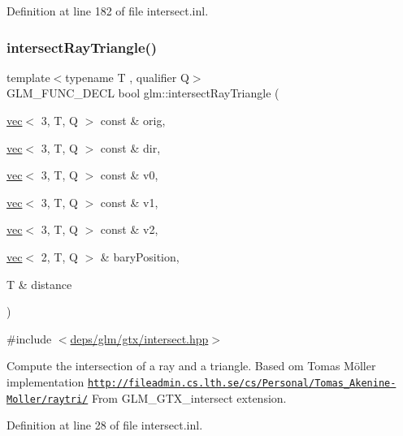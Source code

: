 Definition at line 182 of file intersect.\+inl.

\mbox{\label{group__gtx__intersect_ga65bf2c594482f04881c36bc761f9e946}} 
\subsubsection{\texorpdfstring{intersect\+Ray\+Triangle()}{intersectRayTriangle()}}
{\footnotesize\ttfamily template$<$typename T , qualifier Q$>$ \\
G\+L\+M\+\_\+\+F\+U\+N\+C\+\_\+\+D\+E\+CL bool glm\+::intersect\+Ray\+Triangle (\begin{DoxyParamCaption}\item[{\hyperlink{structglm_1_1vec}{vec}$<$ 3, T, Q $>$ const \&}]{orig,  }\item[{\hyperlink{structglm_1_1vec}{vec}$<$ 3, T, Q $>$ const \&}]{dir,  }\item[{\hyperlink{structglm_1_1vec}{vec}$<$ 3, T, Q $>$ const \&}]{v0,  }\item[{\hyperlink{structglm_1_1vec}{vec}$<$ 3, T, Q $>$ const \&}]{v1,  }\item[{\hyperlink{structglm_1_1vec}{vec}$<$ 3, T, Q $>$ const \&}]{v2,  }\item[{\hyperlink{structglm_1_1vec}{vec}$<$ 2, T, Q $>$ \&}]{bary\+Position,  }\item[{T \&}]{distance }\end{DoxyParamCaption})}



{\ttfamily \#include $<$\hyperlink{intersect_8hpp}{deps/glm/gtx/intersect.\+hpp}$>$}

Compute the intersection of a ray and a triangle. Based om Tomas Möller implementation \href{http://fileadmin.cs.lth.se/cs/Personal/Tomas_Akenine-Moller/raytri/}{\tt http\+://fileadmin.\+cs.\+lth.\+se/cs/\+Personal/\+Tomas\+\_\+\+Akenine-\/\+Moller/raytri/} From G\+L\+M\+\_\+\+G\+T\+X\+\_\+intersect extension. 

Definition at line 28 of file intersect.\+inl.

